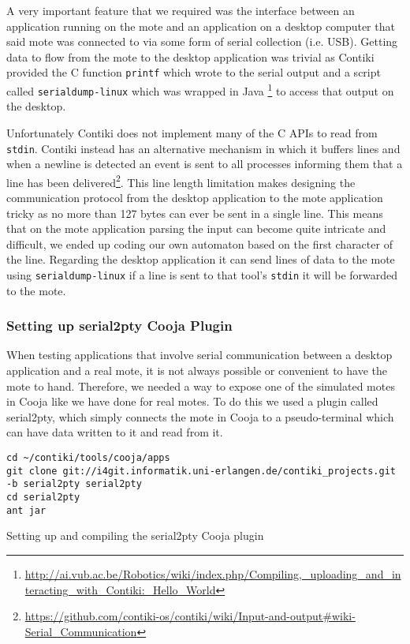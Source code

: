 A very important feature that we required was the interface between an application running on the mote and an application on a desktop computer that said mote was connected to via some form of serial collection (i.e. USB). Getting data to flow from the mote to the desktop application was trivial as Contiki provided the C function \verb|printf| which wrote to the serial output and a script called \verb|serialdump-linux| which was wrapped in Java \footnote{\url{http://ai.vub.ac.be/Robotics/wiki/index.php/Compiling,\_uploading\_and\_interacting\_with\_Contiki:\_Hello_World}} to access that output on the desktop.

Unfortunately Contiki does not implement many of the C APIs to read from \verb|stdin|. Contiki instead has an alternative mechanism in which it buffers lines and when a newline is detected an event is sent to all processes informing them that a line has been delivered\footnote{\url{https://github.com/contiki-os/contiki/wiki/Input-and-output\#wiki-Serial\_Communication}}. This line length limitation makes designing the communication protocol from the desktop application to the mote application tricky as no more than 127 bytes can ever be sent in a single line. This means that on the mote application parsing the input can become quite intricate and difficult, we ended up coding our own automaton \cite{sipser2006introduction} based on the first character of the line. Regarding the desktop application it can send lines of data to the mote using \verb|serialdump-linux| if a line is sent to that tool's \verb|stdin| it will be forwarded to the mote.


\subsubsection{Setting up serial2pty Cooja Plugin}

When testing applications that involve serial communication between a desktop application and a real mote, it is not always possible or convenient to have the mote to hand. Therefore, we needed a way to expose one of the simulated motes in Cooja like we have done for real motes. To do this we used a plugin called serial2pty, which simply connects the mote in Cooja to a pseudo-terminal which can have data written to it and read from it.

\begin{listing}[H]
\begin{verbatim}
cd ~/contiki/tools/cooja/apps
git clone git://i4git.informatik.uni-erlangen.de/contiki_projects.git -b serial2pty serial2pty
cd serial2pty
ant jar
\end{verbatim}
\caption{Setting up and compiling the serial2pty Cooja plugin}
\label{lst:setup-serial2pty}
\end{listing}

